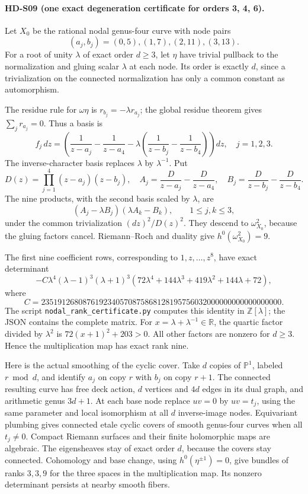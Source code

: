 \paragraph{HD-S09 (one exact degeneration certificate for orders 3, 4, 6).}
Let \(X_0\) be the rational nodal genus-four curve with node pairs
\[
(a_j,b_j)=(0,5),(1,7),(2,11),(3,13).
\]
For a root of unity \(\lambda\) of exact order \(d\ge3\), let \(\eta\)
have trivial pullback to the normalization and gluing scalar \(\lambda\)
at each node. Its order is exactly \(d\), since a trivialization on the
connected normalization has only a common constant as automorphism.

The residue rule for \(\omega\eta\) is
\(r_{b_j}=-\lambda r_{a_j}\); the global residue theorem gives
\(\sum_jr_{a_j}=0\). Thus a basis is
\[
f_j\,dz=
\left(\frac1{z-a_j}-\frac1{z-a_4}
-\lambda\left(\frac1{z-b_j}-\frac1{z-b_4}\right)\right)dz,
\quad j=1,2,3.
\]
The inverse-character basis replaces \(\lambda\) by \(\lambda^{-1}\).
Put
\[
D(z)=\prod_{j=1}^4(z-a_j)(z-b_j),\quad
A_j=\frac D{z-a_j}-\frac D{z-a_4},\quad
B_j=\frac D{z-b_j}-\frac D{z-b_4}.
\]
The nine products, with the second basis scaled by \(\lambda\), are
\[
(A_j-\lambda B_j)(\lambda A_k-B_k),\qquad 1\le j,k\le3,
\]
under the common trivialization \((dz)^2/D(z)^2\).
They descend to \(\omega_{X_0}^2\), because the gluing factors cancel.
Riemann--Roch and duality give \(h^0(\omega_{X_0}^2)=9\).

The first nine coefficient rows, corresponding to \(1,z,\ldots,z^8\),
have exact determinant
\[
-C\lambda^4(\lambda-1)^3(\lambda+1)^3
(72\lambda^4+144\lambda^3+419\lambda^2+144\lambda+72),
\]
where
\[
C=2351912680876192340570875868128195756032000000000000000000.
\]
The script \texttt{nodal\_rank\_certificate.py} computes this identity
in \(\mathbb Z[\lambda]\); the JSON contains the complete matrix.
For \(x=\lambda+\lambda^{-1}\in\mathbb R\), the quartic factor divided by
\(\lambda^2\) is \(72(x+1)^2+203>0\).
All other factors are nonzero for \(d\ge3\).
Hence the multiplication map has exact rank nine.

Here is the actual smoothing of the cyclic cover.
Take \(d\) copies of \(\mathbb P^1\), labeled \(r\bmod d\), and identify
\(a_j\) on copy \(r\) with \(b_j\) on copy \(r+1\).
The connected resulting curve has free deck action, \(d\) vertices and
\(4d\) edges in its dual graph, and arithmetic genus \(3d+1\).
At each base node replace \(uv=0\) by \(uv=t_j\), using the same
parameter and local isomorphism at all \(d\) inverse-image nodes.
Equivariant plumbing gives connected etale cyclic covers of smooth
genus-four curves when all \(t_j\ne0\). Compact Riemann surfaces and
their finite holomorphic maps are algebraic.
The eigensheaves stay of exact order \(d\), because the covers stay
connected. Cohomology and base change, using
\(h^0(\eta^{\pm1})=0\), give bundles of ranks \(3,3,9\) for the three
spaces in the multiplication map. Its nonzero determinant persists
at nearby smooth fibers.


